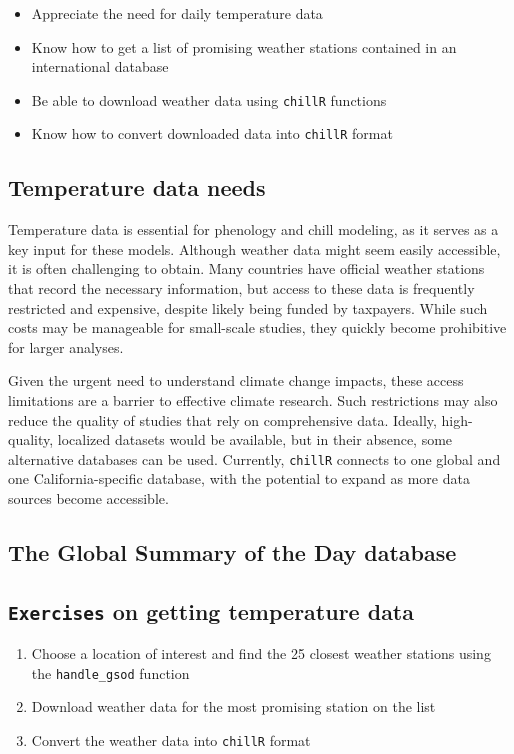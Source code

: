 \documentclass[
]{article}
\providecommand{\tightlist}{%
  \setlength{\itemsep}{0pt}\setlength{\parskip}{0pt}}
\begin{document}
\begin{itemize}
\tightlist
\item
  Appreciate the need for daily temperature data
\item
  Know how to get a list of promising weather stations contained in an international database
\item
  Be able to download weather data using \texttt{chillR} functions
\item
  Know how to convert downloaded data into \texttt{chillR} format
\end{itemize}

\subsection{Temperature data needs}\label{temperature-data-needs}

Temperature data is essential for phenology and chill modeling, as it serves as a key input for these models. Although weather data might seem easily accessible, it is often challenging to obtain. Many countries have official weather stations that record the necessary information, but access to these data is frequently restricted and expensive, despite likely being funded by taxpayers. While such costs may be manageable for small-scale studies, they quickly become prohibitive for larger analyses.

Given the urgent need to understand climate change impacts, these access limitations are a barrier to effective climate research. Such restrictions may also reduce the quality of studies that rely on comprehensive data. Ideally, high-quality, localized datasets would be available, but in their absence, some alternative databases can be used. Currently, \texttt{chillR} connects to one global and one California-specific database, with the potential to expand as more data sources become accessible.

\subsection{The Global Summary of the Day database}\label{the-global-summary-of-the-day-database}

\subsection{\texorpdfstring{\texttt{Exercises} on getting temperature data}{Exercises on getting temperature data}}\label{exercises-on-getting-temperature-data}

\begin{enumerate}
\def\labelenumi{\arabic{enumi}.}
\item
  Choose a location of interest and find the 25 closest weather stations using the \texttt{handle\_gsod} function
\item
  Download weather data for the most promising station on the list
\item
  Convert the weather data into \texttt{chillR} format
\end{enumerate}

  
\end{document}
